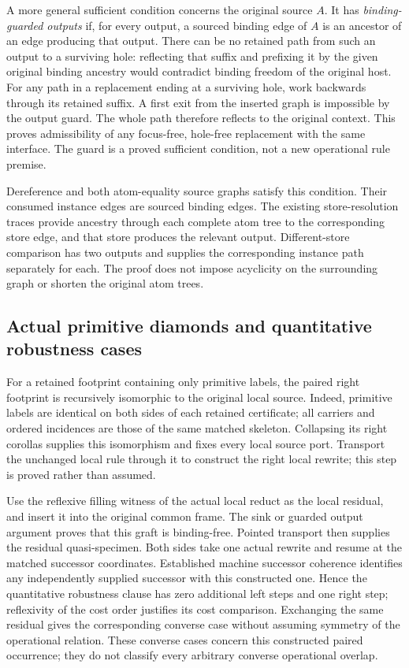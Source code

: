A more general sufficient condition concerns the original source $A$.
It has \emph{binding-guarded outputs} if, for every output, a sourced binding
edge of $A$ is an ancestor of an edge producing that output. There can be no
retained path from such an output to a surviving hole: reflecting that suffix
and prefixing it by the given original binding ancestry would contradict
binding freedom of the original host. For any path in a replacement ending
at a surviving hole, work backwards through its retained suffix. A first
exit from the inserted graph is impossible by the output guard. The whole
path therefore reflects to the original context. This proves admissibility
of any focus-free, hole-free replacement with the same interface. The guard
is a proved sufficient condition, not a new operational rule premise.

Dereference and both atom-equality source graphs satisfy this condition.
Their consumed instance edges are sourced binding edges. The existing
store-resolution traces provide ancestry through each complete atom tree to
the corresponding store edge, and that store produces the relevant output.
Different-store comparison has two outputs and supplies the corresponding
instance path separately for each. The proof does not impose acyclicity on
the surrounding graph or shorten the original atom trees.

\subsection{Actual primitive diamonds and quantitative robustness cases}
For a retained footprint containing only primitive labels, the paired right
footprint is recursively isomorphic to the original local source. Indeed,
primitive labels are identical on both sides of each retained certificate;
all carriers and ordered incidences are those of the same matched skeleton.
Collapsing its right corollas supplies this isomorphism and fixes every local
source port. Transport the unchanged local rule through it to construct the
right local rewrite; this step is proved rather than assumed.

Use the reflexive filling witness of the actual local reduct as the local
residual, and insert it into the original common frame. The sink or guarded
output argument proves that this graft is binding-free. Pointed transport
then supplies the residual quasi-specimen. Both sides take one actual rewrite
and resume at the matched successor coordinates. Established machine
successor coherence identifies any independently supplied successor with
this constructed one. Hence the quantitative robustness clause has zero
additional left steps and one right step; reflexivity of the cost order
justifies its cost comparison. Exchanging the same residual gives the
corresponding converse case without assuming symmetry of the operational
relation. These converse cases concern this constructed paired occurrence;
they do not classify every arbitrary converse operational overlap.

